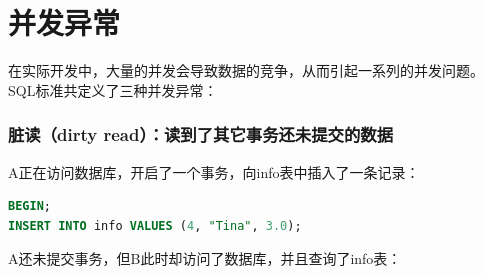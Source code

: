 \documentclass[12pt, openany, oneside]{book}
\begin{document}
\begin{table}[H]
    \centering
    \caption{事务控制语句}
\end{table}

\section{并发异常}

在实际开发中，大量的并发会导致数据的竞争，从而引起一系列的并发问题。 \\

SQL标准共定义了三种并发异常：

\subsubsection{脏读（dirty read）：读到了其它事务还未提交的数据}

A正在访问数据库，开启了一个事务，向info表中插入了一条记录：

\vspace{-0.5cm}

\begin{lstlisting}[language=SQL]
BEGIN;
INSERT INTO info VALUES (4, "Tina", 3.0);
\end{lstlisting}

A还未提交事务，但B此时却访问了数据库，并且查询了info表：

\vspace{-0.5cm}
\end{document}
